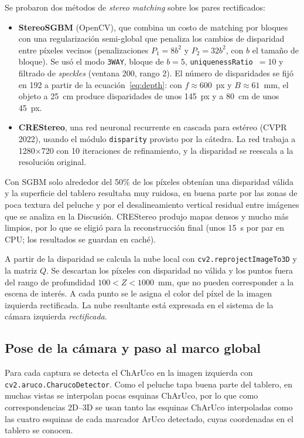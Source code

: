 \documentclass[conference]{IEEEtran}
\begin{document}
Se probaron dos métodos de \emph{stereo matching} sobre los pares
rectificados:
\begin{itemize}
  \item \textbf{StereoSGBM} (OpenCV), que combina un costo de matching por
        bloques con una regularización semi-global que penaliza los cambios
        de disparidad entre píxeles vecinos (penalizaciones
        $P_1=8b^2$ y $P_2=32b^2$, con $b$ el tamaño de bloque).
        Se usó el modo \texttt{3WAY}, bloque de $b=5$,
        \texttt{uniquenessRatio}~$=10$ y filtrado de \emph{speckles}
        (ventana 200, rango 2). El número de disparidades se fijó en 192 a
        partir de la ecuación~\eqref{eq:depth}: con $f\approx600$~px y
        $B\approx61$~mm, el objeto a 25~cm produce disparidades de unos
        145~px y a 80~cm de unos 45~px.
  \item \textbf{CREStereo}, una red neuronal recurrente en cascada para
        estéreo (CVPR 2022), usando el módulo \texttt{disparity} provisto por
        la cátedra. La red trabaja a 1280$\times$720 con 10 iteraciones de
        refinamiento, y la disparidad se reescala a la resolución original.
\end{itemize}
Con SGBM solo alrededor del 50\% de los píxeles obtenían una disparidad
válida y la superficie del tablero resultaba muy ruidosa, en buena parte por
las zonas de poca textura del peluche y por el desalineamiento vertical
residual entre imágenes que se analiza en la Discusión. CREStereo produjo
mapas densos y mucho más limpios, por lo que se eligió para la reconstrucción
final (unos 15~s por par en CPU; los resultados se guardan en caché).

A partir de la disparidad se calcula la nube local con
\texttt{cv2.reprojectImageTo3D} y la matriz $Q$. Se descartan los píxeles con
disparidad no válida y los puntos fuera del rango de profundidad
$100<Z<1000$~mm, que no pueden corresponder a la escena de interés. A cada
punto se le asigna el color del píxel de la imagen izquierda rectificada. La
nube resultante está expresada en el sistema de la cámara izquierda
\emph{rectificada}.

\subsection{Pose de la cámara y paso al marco global}

Para cada captura se detecta el ChArUco en la imagen izquierda con
\texttt{cv2.aruco.CharucoDetector}. Como el peluche tapa buena parte del
tablero, en muchas vistas se interpolan pocas esquinas ChArUco, por lo que
como correspondencias 2D--3D se usan tanto las esquinas ChArUco interpoladas
como las cuatro esquinas de cada marcador ArUco detectado, cuyas coordenadas
en el tablero se conocen.
\end{document}
